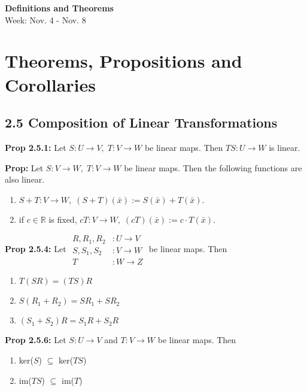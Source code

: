\noindent
\textbf{\LARGE Definitions and Theorems} \\
\large Week: Nov. 4 - Nov. 8

\normalsize

\section*{Theorems, Propositions and Corollaries}

\subsection*{2.5 Composition of Linear Transformations}

\textbf{Prop 2.5.1:} Let $S: U \rightarrow V, \; T: V \rightarrow W$ be linear maps. Then $TS: U \rightarrow W$ is linear.

\bigskip

\noindent
\textbf{Prop:} Let $S: V \rightarrow W, \; T: V \rightarrow W$ be linear maps. Then the following functions are also linear. 
\begin{enumerate}
    \item $S + T: V \rightarrow W, \; (S + T)(\bar x) := S(\bar x) + T(\bar x).$
    \item if $c \in \mathbb{R}$ is fixed, $cT: V \rightarrow W,\; (cT)(\bar x) := c \cdot T(\bar x)$.
\end{enumerate}

\bigskip 

\noindent 
\textbf{Prop 2.5.4:} 
Let
$\begin{aligned}
    R, R_1, R_2 &: U \rightarrow V \\
    S, S_1, S_2 &: V \rightarrow W \\ 
    T &: W \rightarrow Z
\end{aligned}$ be linear maps. Then 
\begin{enumerate}
    \item $T(SR) = (TS)R$
    \item $S(R_1 + R_2) = SR_1 + SR_2$
    \item $(S_1 + S_2)R = S_1R + S_2R$
\end{enumerate}

\bigskip 

\noindent 
\textbf{Prop 2.5.6:} Let $S: U \rightarrow V$ and $T: V \rightarrow W$ be linear maps. Then 
\begin{enumerate}
    \item ker($S$) $\subseteq$ ker($TS$)
    \item im($TS$) $\subseteq$ im($T$)
\end{enumerate}

